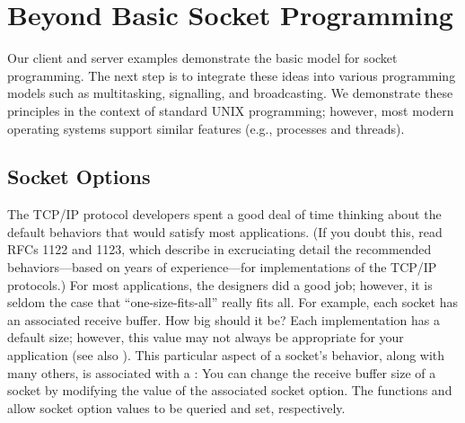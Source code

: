 \chapter{Beyond Basic Socket Programming}
\label{chap:advanced}

Our client and server examples
demonstrate the basic model for socket programming.  The next step is
to integrate these ideas into various programming models such as
multitasking, signalling, and broadcasting.  We demonstrate these
principles in the context of standard UNIX programming; however, most
modern operating systems support similar features (e.g., processes
and threads).

\section{Socket Options}
\label{sect:socketoptions}

\noindent The TCP/IP protocol developers spent a good deal of time
thinking about the default behaviors that would satisfy most
applications.  (If you doubt this, 
read RFCs 1122 and 1123, which describe in excruciating detail
the recommended behaviors---based on years of experience---for 
implementations of the TCP/IP protocols.)
For most applications, the designers did a good job; however, it is
seldom the case that ``one-size-fits-all'' really fits all.  For
example, each socket has an associated receive buffer.
How big should it be?  Each implementation has
a default size; however, this value may not always be appropriate for
your application (see also ).
This particular aspect of a socket's behavior, along with many others,
is associated with a : You can
change the receive
buffer size of a socket by modifying the value of the associated
socket option.  The functions  and
 allow
socket option values to be queried and set, respectively.

